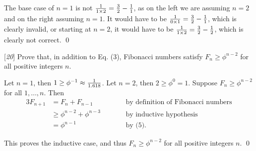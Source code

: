 \sol The base case of $n=1$ is not ${1 \over 1\times 2} = {3 \over 2} - {1 \over 1}$, as on the left we are assuming $n=2$ and on the right assuming $n=1$. It would have to be ${1 \over 0\times 1} = {3 \over 2} - {1 \over 1}$, which is clearly invalid, or starting at $n=2$, it would have to be ${1 \over 1 \times 2} = {3 \over 2} - {1 \over 2}$, which is clearly not correct. \qed

 [\textit{20}] Prove that, in addition to Eq. (3), Fibonacci numbers satisfy $F_n \geq \phi^{n-2}$ for all positive integers $n$.

\pf Let $n = 1$, then $1 \geq \phi^{-1} \approx {1 \over 1.618}$. Let $n=2$, then $2 \geq \phi^{0} = 1$. Suppose $F_n \geq \phi^{n-2}$ for all $1, \dots, n$. Then 
\begin{alignat*}{3}
    F_{n+1} &= F_{n} + F_{n-1} &&\text{by definition of Fibonacci numbers}\\
    &\geq \phi^{n-2} + \phi^{n-3} \qquad &&\text{by inductive hypothesis}\\
    &= \phi^{n-1} \qquad &&\text{by (5).}
\end{alignat*}

This proves the inductive case, and thus $F_n \geq \phi^{n-2}$ for all positive integers $n$. \qed